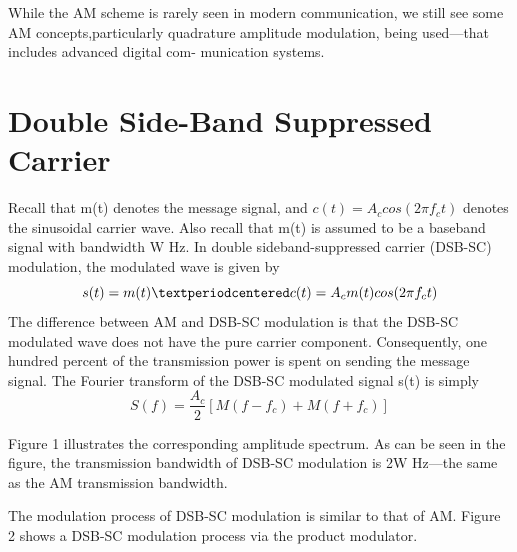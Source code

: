 While the AM scheme is rarely seen in modern communication, we still see some AM concepts,particularly quadrature amplitude modulation, being used—that includes advanced digital com-
munication systems.


\chapter{Double Side-Band Suppressed Carrier}
Recall that m(t) denotes the message signal, and $c(t) = A_c cos(2 \pi f_ct)$ denotes the sinusoidal carrier
wave. Also recall that m(t) is assumed to be a baseband signal with bandwidth W Hz. In double
sideband-suppressed carrier (DSB-SC) modulation, the modulated wave is given by
\begin{equation}
  s(t) = m(t) · c(t)\\
  = A_cm(t) cos(2\pi f_c t)

\end{equation}
The difference between AM and DSB-SC modulation is that the DSB-SC modulated wave does not
have the pure carrier component. Consequently, one hundred percent of the transmission power is
spent on sending the message signal. The Fourier transform of the DSB-SC modulated signal s(t)
is simply
\begin{equation}
  S(f) = \frac{A_c}{2}[M(f − f_c ) + M(f + f_c )]
\end{equation}

Figure 1 illustrates the corresponding amplitude spectrum. As can be seen in the figure, the
transmission bandwidth of DSB-SC modulation is 2W Hz—the same as the AM transmission
bandwidth.


The modulation process of DSB-SC modulation is similar to that of AM. Figure 2 shows a
DSB-SC modulation process via the product modulator.
